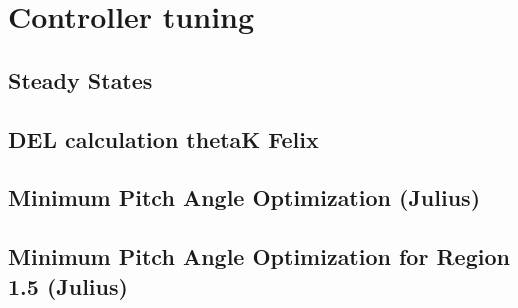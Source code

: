 \chapter{Controller tuning}
\section{Steady States} \label{steady states}

\section{DEL calculation thetaK Felix}

\section{Minimum Pitch Angle Optimization (Julius)} \label{minimum pitch angle static}


\section{Minimum Pitch Angle Optimization for Region 1.5 (Julius)} 

